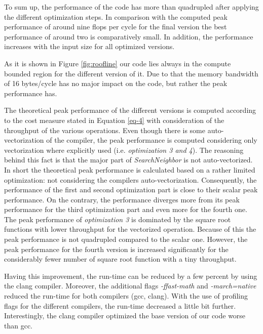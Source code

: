 \documentclass[letterpaper]{article}
\begin{document}
To sum up, the performance of the code has more than quadrupled after applying the different optimization steps.
In comparison with the computed peak performance of around nine flops per cycle for the final version the best performance of around two is comparatively small.
In addition, the performance increases with the input size for all optimized versions.

As it is shown in Figure \ref{fig:roofline} our code lies always in the compute bounded region for the different version of it. Due to that the memory bandwidth of 16 bytes/cycle has no major impact on the code, but rather the peak performance has.

The theoretical peak performance of the different versions is computed according to the cost measure stated in Equation \ref{eq-4} with consideration of the throughput of the various operations.
Even though there is some auto-vectorization of the compiler, the peak performance is computed considering only vectorization where explicitly used (i.e. \emph{optimization 3 and 4}).
The reasoning behind this fact is that the major part of \emph{SearchNeighbor} is not auto-vectorized.
In short the theoretical peak performance is calculated based on a rather limited optimization: not considering the compilers auto-vectorization. 
Consequently, the performance of the first and second optimization part is close to their scalar peak performance.
On the contrary, the performance diverges more from its peak performance for the third optimization part and even more for the fourth one.
The peak performance of \emph{optimization 3} is dominated by the square root functions with lower throughput for the vectorized operation.
Because of this the peak performance is not quadrupled compared to the scalar one.
However, the peak performance for the fourth version is increased significantly for the considerably fewer number of square root function with a tiny throughput.

Having this improvement, the run-time can be reduced by a few percent by using the clang compiler. Moreover, the additional flags \emph{-ffast-math} and \emph{-march=native} reduced the run-time for both compilers (gcc, clang). With the use of profiling flags for the different compilers, the run-time decreased a little bit further. Interestingly, the clang compiler optimized the base version of our code worse than gcc.

\end{document}

